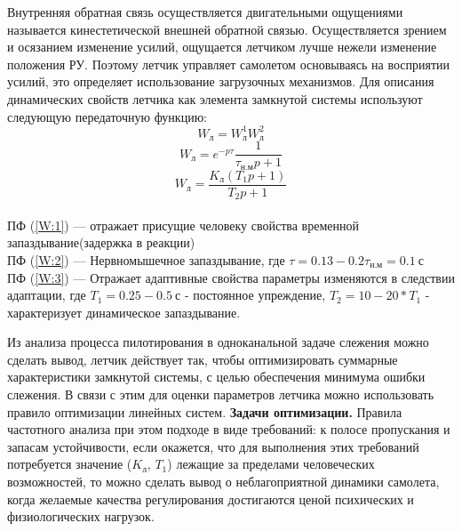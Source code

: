 \documentclass{article}
\begin{document}
Внутренняя обратная связь осуществляется двигательными ощущениями называется кинестетической внешней обратной связью. Осуществляется зрением и осязанием изменение усилий, ощущается летчиком лучше нежели изменение положения РУ. Поэтому летчик управляет самолетом основываясь на восприятии усилий, это определяет использование загрузочных механизмов. Для описания динамических свойств летчика как элемента замкнутой системы используют следующую передаточную функцию:
\begin{equation} \label{W:1}
	W_\text{л} = W_\text{л}^1 W_\text{л}^2 
\end{equation}
\begin{equation} \label{W:2}
	W_\text{л} = e^{-p\tau} \frac{1}{\tau_\text{н.м} p +1}
\end{equation}
\begin{equation} \label{W:3}
    W_\text{л} = \frac{K_\text{л}(T_1 p + 1)}{T_2 p +1}
\end{equation}\\
ПФ (\ref{W:1}) --- отражает присущие человеку свойства временной запаздывание(задержка в реакции)\\
ПФ (\ref{W:2}) --- Нервномышечное запаздывание, где $\tau = 0.13 - 0.2 \tau_\text{н.м}= 0.1 \ \text{с}$ \\
ПФ (\ref{W:3}) --- Отражает адаптивные свойства параметры изменяются в следствии адаптации, где $T_1 = 0.25 - 0.5 \ \text{с}$ - постоянное упреждение, $T_2 = 10 - 20 * T_1$ - характеризует динамическое запаздывание.

Из анализа процесса пилотирования в одноканальной задаче слежения можно сделать вывод, летчик действует так, чтобы оптимизировать суммарные характеристики замкнутой системы, с целью обеспечения минимума ошибки слежения. В связи с этим для оценки параметров летчика можно использовать правило оптимизации линейных систем.
\textbf{Задачи оптимизации.} Правила частотного анализа при этом подходе в виде требований: к полосе пропускания и запасам устойчивости, если окажется, что для выполнения этих требований потребуется значение ($K_\text{л}, \, T_1$) лежащие за пределами человеческих возможностей, то можно сделать вывод о неблагоприятной динамики самолета, когда желаемые качества регулирования достигаются ценой психических и физиологических нагрузок.
\end{document}
